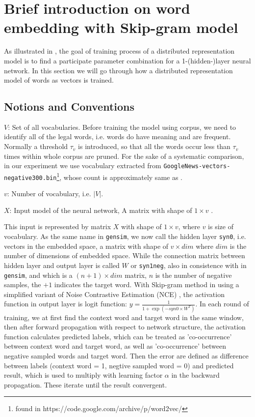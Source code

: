 \section{Brief introduction on word embedding with Skip-gram model}
As illustrated in \cite{mikolov2013distributed}, the goal of training process of a distributed representation model is to find a participate parameter combination for a 1-(hidden-)layer neural network. In this section we will go through how a distributed representation model of words as vectors is trained.

  \subsection{Notions and Conventions}
  $V$: Set of all vocabularies. Before training the model using corpus, we need to identify all of the legal words, i.e. words do have meaning and are frequent. Normally a threshold $\tau_v$ is introduced, so that all the words occur less than $\tau_v$ times within whole corpus are pruned. For the sake of a systematic comparison, in our experiment we use vocabulary extracted from \verb|GoogleNews-vectors-negative300.bin|\footnote{found in https://code.google.com/archive/p/word2vec/}, whose count is approximately same as \cite{levy2015improving}.

  $v$: Number of vocabulary, i.e. $|V|$.

  $X$: Input model of the neural network, A matrix with shape of $1 \times v$ .

This input is represented by matrix $X$ with shape of $1\times v$, where $v$ is size of vocabulary. As the same name in \verb|gensim|, we now call the hidden layer \verb|syn0|, i.e. vectors in the embedded space, a matrix with shape of $v\times dim$ where $dim$ is the number of dimensions of embedded space. While the connection matrix between hidden layer and output layer is called $W$ or \verb|syn1neg|, also in consistence with in \verb|gensim|, and which is a $(n+1)\times dim$ matrix, $n$ is the number of negative samples, the $+1$ indicates the target word. With Skip-gram method in \cite{mikolov2013distributed} using a simplified variant of Noise Contrastive Estimation (NCE) \cite{gutmann2012noise}, the activation function in output layer is logit function: $y=\frac{1}{1+\exp(-syn0\times W^T)}$. In each round of training, we at first find the context word and target word in the same window, then after forward propagation with respect to network structure, the activation function calculates predicted labels, which can be treated as 'co-occurrence' between context word and target word, as well as 'co-occurrence' between negative sampled words and target word. Then the error are defined as difference between labels (context word = 1, negtive sampled word = 0) and predicted result, which is used to multiply with learning factor $\alpha$ in the backward propagation. These iterate until the result convergent.
